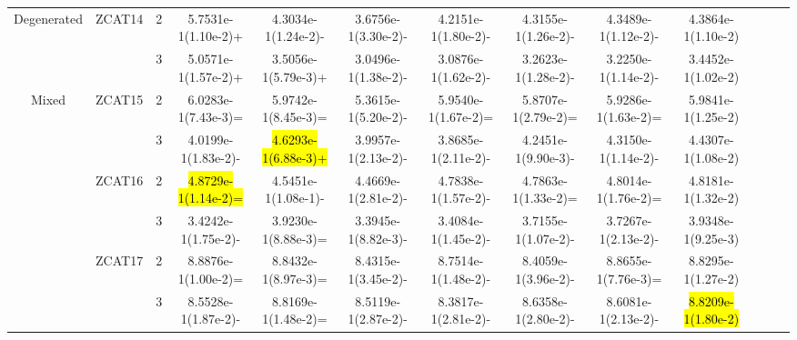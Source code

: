\documentclass[a4paper,fleqn]{cas-dc}
\newcommand{\highlight}[1]{
	\begingroup
	\sethlcolor{Seashell}%
	\hl{#1}%
	\endgroup
}
\begin{document}
\begin{sloppypar}
\begin{table}[ht]
{\begin{tabular}{ccccccccccccc}
					
					
					
					
					
					\multirow{2}{*}{Degenerated}&\multirow{2}{*}{ZCAT14}&2  &5.7531e-1(1.10e-2)+	&4.3034e-1(1.24e-2)-	&3.6756e-1(3.30e-2)-	&4.2151e-1(1.80e-2)-	&4.3155e-1(1.26e-2)-	&4.3489e-1(1.12e-2)-	&4.3864e-1(1.10e-2)\\
					
					\multirow{2}{*}{~}&\multirow{2}{*}{~}&3 &5.0571e-1(1.57e-2)+	&3.5056e-1(5.79e-3)+	&3.0496e-1(1.38e-2)-	&3.0876e-1(1.62e-2)-	&3.2623e-1(1.28e-2)-	&3.2250e-1(1.14e-2)-	&3.4452e-1(1.02e-2)\\
					\hline
					
					
					\multirow{12}{*}{Mixed}&\multirow{2}{*}{ZCAT15}&2 &6.0283e-1(7.43e-3)= &5.9742e-1(8.45e-3)=	&5.3615e-1(5.20e-2)-	&5.9540e-1(1.67e-2)=	&5.8707e-1(2.79e-2)=	&5.9286e-1(1.63e-2)=	&5.9841e-1(1.25e-2)\\
					
					\multirow{12}{*}{~}&\multirow{2}{*}{~}&3&4.0199e-1(1.83e-2)-	&\highlight{4.6293e-1(6.88e-3)+}	&3.9957e-1(2.13e-2)-	&3.8685e-1(2.11e-2)-	&4.2451e-1(9.90e-3)-	&4.3150e-1(1.14e-2)-	&4.4307e-1(1.08e-2)\\
					
					
					
					
					
					\multirow{12}{*}{~}&\multirow{2}{*}{ZCAT16}&2	&\highlight{4.8729e-1(1.14e-2)=}	&4.5451e-1(1.08e-1)-	&4.4669e-1(2.81e-2)-	&4.7838e-1(1.57e-2)-	&4.7863e-1(1.33e-2)=	&4.8014e-1(1.76e-2)=	&4.8181e-1(1.32e-2)\\
					
					\multirow{12}{*}{~}&\multirow{2}{*}{~}&3&3.4242e-1(1.75e-2)-	&3.9230e-1(8.88e-3)=	&3.3945e-1(8.82e-3)-	&3.4084e-1(1.45e-2)-	&3.7155e-1(1.07e-2)-	&3.7267e-1(2.13e-2)-	&3.9348e-1(9.25e-3)\\
					
					
					\multirow{12}{*}{~}&\multirow{2}{*}{ZCAT17}&2	&8.8876e-1(1.00e-2)=		&8.8432e-1(8.97e-3)=	&8.4315e-1(3.45e-2)-	&8.7514e-1(1.48e-2)-	&8.4059e-1(3.96e-2)-	&8.8655e-1(7.76e-3)=	&8.8295e-1(1.27e-2)\\
					
					\multirow{12}{*}{~}&\multirow{2}{*}{~}&3		&8.5528e-1(1.87e-2)-	&8.8169e-1(1.48e-2)=	&8.5119e-1(2.87e-2)-	&8.3817e-1(2.81e-2)-	&8.6358e-1(2.80e-2)-	&8.6081e-1(2.13e-2)-	&\highlight{8.8209e-1(1.80e-2)}\\
					
					

\end{tabular}}
\end{table}
\end{sloppypar}
\end{document}
